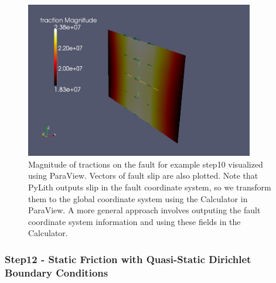 \begin{figure}
\begin{centering}
\includegraphics[width=10cm]{tutorials/3dhex8/figs/step11-fault-traction-slip}
\par\end{centering}

\caption{Magnitude of tractions on the fault for example step10 visualized
using ParaView. Vectors of fault slip are also plotted. Note that
PyLith outputs slip in the fault coordinate system, so we transform
them to the global coordinate system using the Calculator in ParaView.
A more general approach involves outputing the fault coordinate system
information and using these fields in the Calculator. \label{fig:step11-fault-traction-slip}}
\end{figure}



\subsubsection{Step12 - Static Friction with Quasi-Static Dirichlet Boundary Conditions}

